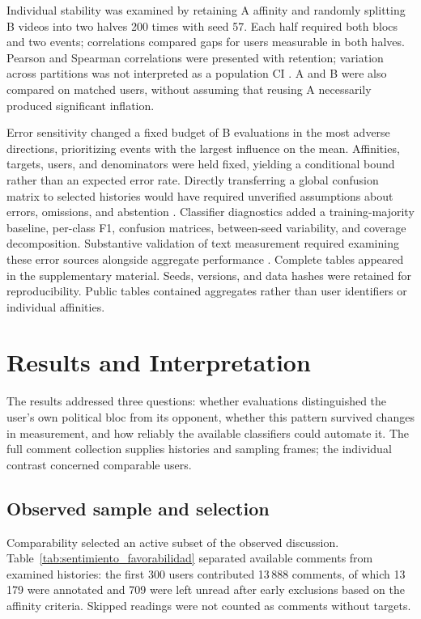 \documentclass[conference, letterpaper]{IEEEtran}
\begin{document}
Individual stability was examined by retaining A affinity and randomly splitting B videos into two halves 200 times with seed 57. Each half required both blocs and two events; correlations compared gaps for users measurable in both halves. Pearson and Spearman correlations were presented with retention; variation across partitions was not interpreted as a population CI \cite{Pronk2022SplitHalf}. A and B were also compared on matched users, without assuming that reusing A necessarily produced significant inflation.

Error sensitivity changed a fixed budget of B evaluations in the most adverse directions, prioritizing events with the largest influence on the mean. Affinities, targets, users, and denominators were held fixed, yielding a conditional bound rather than an expected error rate. Directly transferring a global confusion matrix to selected histories would have required unverified assumptions about errors, omissions, and abstention \cite{Egami2023Surrogates}. Classifier diagnostics added a training-majority baseline, per-class F1, confusion matrices, between-seed variability, and coverage decomposition. Substantive validation of text measurement required examining these error sources alongside aggregate performance \cite{GrimmerStewart2013}. Complete tables appeared in the supplementary material. Seeds, versions, and data hashes were retained for reproducibility. Public tables contained aggregates rather than user identifiers or individual affinities.

\section{Results and Interpretation}

The results addressed three questions: whether evaluations distinguished the user's own political bloc 
from its opponent, whether this pattern survived changes in measurement, and how reliably the 
available classifiers could automate it. The full comment collection supplies histories and 
sampling frames; the individual contrast concerned comparable users.

\subsection{Observed sample and selection}
Comparability selected an active subset of the observed discussion. Table~\ref{tab:sentimiento_favorabilidad}
separated available comments from examined histories: the first 300 users contributed 13\,888 comments,
of which 13\,179 were annotated and 709 were left unread after early exclusions based on the affinity criteria. Skipped readings were not counted as comments without targets.
\end{document}

